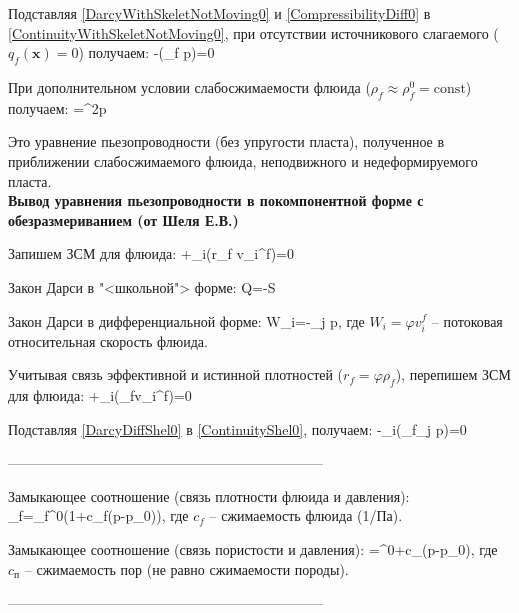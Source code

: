 Подставляя \eqref{DarcyWithSkeletNotMoving0} и \eqref{CompressibilityDiff0} в \eqref{ContinuityWithSkeletNotMoving0}, при отсутствии источникового слагаемого ($q_f(\pmb{x})=0$) получаем:
\beq
\varphi{}-\pmb{\nabla}\cdot\left(\rho_f\pmb{\nabla} p\right)=0
\eeq

При дополнительном условии слабосжимаемости флюида ($\rho_f\approx\rho_f^0=\textrm{const}$) получаем:
\beq
{}=\pmb{\nabla}^2p
\eeq

Это уравнение пьезопроводности (без упругости пласта), полученное в приближении слабосжимаемого флюида, неподвижного и недеформируемого пласта.
\\

\textbf{Вывод уравнения пьезопроводности в покомпонентной форме с обезразмериванием (от Шеля Е.В.)}

Запишем ЗСМ для флюида:
\beq
{}+\partial_i\left(r_f v_i^f\right)=0
\eeq

Закон Дарси в "<школьной"> форме:
\beq
Q=-S
\eeq

Закон Дарси в дифференциальной форме:
\beq\label{DarcyDiffShel0}
W_i=-\partial_j p,
\eeq
где $W_i=\varphi v_i^f$ -- потоковая относительная скорость флюида.

Учитывая связь эффективной и истинной плотностей ($r_f=\varphi\rho_f$), перепишем ЗСМ для флюида:
\beq\label{ContinuityShel0}
+\partial_i\left(\rho_f\varphi v_i^f\right)=0
\eeq

Подставляя \eqref{DarcyDiffShel0} в \eqref{ContinuityShel0}, получаем:
\beq\label{GeneralPiezo0}
-\partial_i\left(\rho_f\partial_j p\right)=0
\eeq

--------------------------------------------------------------------

Замыкающее соотношение (связь плотности флюида и давления):
\beq\label{Zam10}
\rho_f=\rho_f^0\left(1+c_f\left(p-p_0\right)\right),
\eeq
где $c_f$ -- сжимаемость флюида (1/Па).


Замыкающее соотношение (связь пористости и давления):
\beq\label{Zam20}
\varphi=\varphi^0+c_{}\left(p-p_0\right),
\eeq
где $c_{\text{п}}$ -- сжимаемость пор (не равно сжимаемости породы).

--------------------------------------------------------------------


